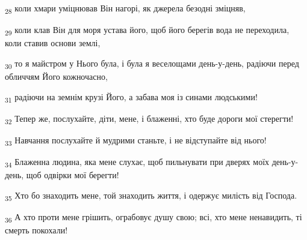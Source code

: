 \begin{tcolorbox}
\textsubscript{28} коли хмари уміцнював Він нагорі, як джерела безодні зміцняв,
\end{tcolorbox}
\begin{tcolorbox}
\textsubscript{29} коли клав Він для моря устава його, щоб його берегів вода не переходила, коли ставив основи землі,
\end{tcolorbox}
\begin{tcolorbox}
\textsubscript{30} то я майстром у Нього була, і була я веселощами день-у-день, радіючи перед обличчям Його кожночасно,
\end{tcolorbox}
\begin{tcolorbox}
\textsubscript{31} радіючи на земнім крузі Його, а забава моя із синами людськими!
\end{tcolorbox}
\begin{tcolorbox}
\textsubscript{32} Тепер же, послухайте, діти, мене, і блаженні, хто буде дороги мої стерегти!
\end{tcolorbox}
\begin{tcolorbox}
\textsubscript{33} Навчання послухайте й мудрими станьте, і не відступайте від нього!
\end{tcolorbox}
\begin{tcolorbox}
\textsubscript{34} Блаженна людина, яка мене слухає, щоб пильнувати при дверях моїх день-у-день, щоб одвірки мої берегти!
\end{tcolorbox}
\begin{tcolorbox}
\textsubscript{35} Хто бо знаходить мене, той знаходить життя, і одержує милість від Господа.
\end{tcolorbox}
\begin{tcolorbox}
\textsubscript{36} А хто проти мене грішить, ограбовує душу свою; всі, хто мене ненавидить, ті смерть покохали!
\end{tcolorbox}
